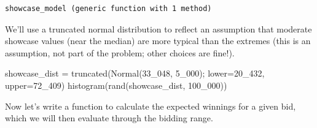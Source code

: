 \documentclass[
  letterpaper,
  DIV=11,
  numbers=noendperiod]{scrartcl}
\newenvironment{Shaded}{\begin{snugshade}}{\end{snugshade}}
\newcommand{\FloatTok}[1]{\textcolor[rgb]{0.68,0.00,0.00}{#1}}
\newcommand{\FunctionTok}[1]{\textcolor[rgb]{0.28,0.35,0.67}{#1}}
\newcommand{\NormalTok}[1]{\textcolor[rgb]{0.00,0.23,0.31}{#1}}
\newcommand{\OperatorTok}[1]{\textcolor[rgb]{0.37,0.37,0.37}{#1}}
\begin{document}
\begin{verbatim}
showcase_model (generic function with 1 method)
\end{verbatim}

We'll use a truncated normal distribution to reflect an assumption that
moderate showcase values (near the median) are more typical than the
extremes (this is an assumption, not part of the problem; other choices
are fine!).

\begin{Shaded}
\begin{Highlighting}[]
\NormalTok{showcase\_dist }\OperatorTok{=} \FunctionTok{truncated}\NormalTok{(}\FunctionTok{Normal}\NormalTok{(}\FloatTok{33\_048}\NormalTok{, }\FloatTok{5\_000}\NormalTok{); lower}\OperatorTok{=}\FloatTok{20\_432}\NormalTok{, upper}\OperatorTok{=}\FloatTok{72\_409}\NormalTok{)}
\FunctionTok{histogram}\NormalTok{(}\FunctionTok{rand}\NormalTok{(showcase\_dist, }\FloatTok{100\_000}\NormalTok{))}
\end{Highlighting}
\end{Shaded}

\begin{figure}[H]


\end{figure}%

Now let's write a function to calculate the expected winnings for a
given bid, which we will then evaluate through the bidding range.
\end{document}
